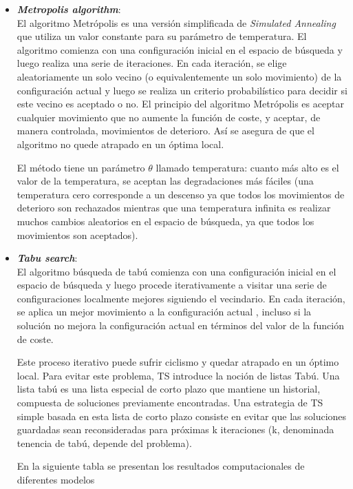 \documentclass[letter, 10pt]{article}
\begin{document}
\begin{itemize}
 \item \textbf{\textit{Metropolis algorithm}}: \\
 El algoritmo Metrópolis es una versión simplificada de \textit{Simulated Annealing} que utiliza un valor constante para su parámetro de temperatura. El algoritmo comienza con una configuración inicial en el espacio de búsqueda y luego realiza una serie de iteraciones. En cada iteración, se elige aleatoriamente un solo vecino (o equivalentemente un solo movimiento) de la configuración actual y luego se realiza un criterio probabilístico para decidir si este vecino es aceptado o no. El principio del algoritmo Metrópolis es aceptar cualquier movimiento que no aumente la función de coste, y aceptar, de manera controlada, movimientos de deterioro. Así se asegura de que el algoritmo no quede atrapado en un óptima local.
 
El método tiene un parámetro $\theta$ llamado temperatura: cuanto más alto es el valor de la temperatura, se aceptan las degradaciones más fáciles (una temperatura cero corresponde a un descenso ya que todos los movimientos de deterioro son rechazados mientras que una temperatura infinita es realizar muchos cambios aleatorios en el espacio de búsqueda, ya que todos los movimientos son aceptados).

\item \textbf{\textit{Tabu search}}: \\
El algoritmo búsqueda de tabú comienza con una configuración inicial en el espacio de búsqueda y luego procede iterativamente a visitar una serie de configuraciones localmente mejores siguiendo el vecindario. En cada iteración, se aplica un mejor movimiento a la configuración actual , incluso si la solución no mejora la configuración actual en términos del valor de la función de coste. 

Este proceso iterativo puede sufrir ciclismo y quedar atrapado en un óptimo local. Para evitar este problema, TS introduce la noción de listas Tabú. Una lista tabú es una lista especial de corto plazo que mantiene un historial, compuesta de soluciones previamente encontradas. Una estrategia de TS simple basada en esta lista de corto plazo consiste en evitar que las soluciones guardadas sean reconsideradas para próximas k iteraciones (k, denominada tenencia de tabú, depende del problema). 

En la siguiente tabla se presentan los resultados computacionales de diferentes modelos

\end{itemize}
\end{document}
